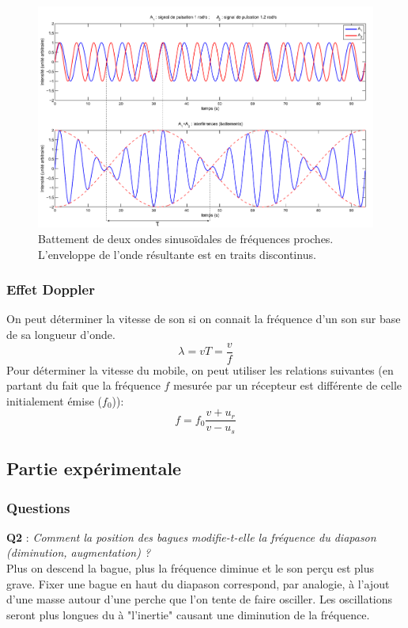 \documentclass	[11pt, a4paper, openany]{book}
\begin{document}
		\begin{figure}[h]
			\begin{center}
				\includegraphics[scale=0.5]{labo/image1.png}
			\end{center}
			\caption{Battement de deux ondes sinusoïdales de fréquences proches. L'enveloppe de l'onde résultante est en traits discontinus.}
			\label{image0}
		\end{figure}
		
		\subsubsection{Effet Doppler}
		On peut déterminer la vitesse de son si on connait la fréquence d'un son sur base de sa longueur d'onde.
		\begin{equation}
			\lambda = vT = \frac{v}{f}
			\label{lambda}
		\end{equation}
		Pour déterminer la vitesse du mobile, on peut utiliser les relations suivantes (en partant du fait que la fréquence $f$ mesurée par un récepteur est différente de celle initialement émise ($f_0$)):
		\begin{equation}
			f = f_0\frac{v + u_{r}}{v - u_{s}}
			\label{doppler}
		\end{equation}
		
		\subsection{Partie expérimentale}
		\subsubsection{Questions}
		\textbf{Q2} : \textit{Comment la position des bagues modifie-t-elle la fréquence du diapason (diminution, augmentation) ?}\\
		Plus on descend la bague, plus la fréquence diminue et le son perçu est plus grave. Fixer une bague en haut du diapason correspond, par analogie, à l'ajout d'une masse autour d'une perche que l'on tente de faire osciller. Les oscillations seront plus longues du à "l'inertie" causant une diminution de la fréquence.\\
		
\end{document}
